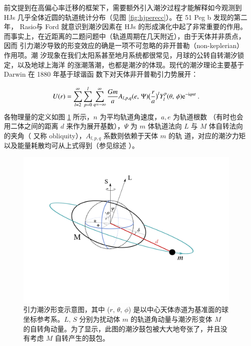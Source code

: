 前文提到在高偏心率迁移的框架下，需要额外引入潮汐过程才能解释如今观测到 HJs
几乎全体近圆的轨道统计分布（见图 \ref{fig:hjperecc}）。在 51 Peg b 发现的第二年，
Rasio与 Ford 就意识到潮汐因素在 HJs 的形成演化中起了非常重要的作用\cite{Rasio1996b}。
而事实上，在近距离的二题问题中（轨道周期在几天附近），由于天体并非质点，因而
引力潮汐导致的形变效应的确是一项不可忽略的非开普勒（non-keplerian）作用项。潮
汐现象在我们太阳系甚至地月系统都很常见，月球的公转自转潮汐锁定，以及地球上海洋
的涨潮落潮，也都是潮汐的体现。现代的潮汐理论主要基于 Darwin 在 1880 年基于球谐函
数下对天体非开普勒引力势展开\cite{Darwin1880}：

\begin{equation} \label{gravipotential}
U(r) = \sum\limits_{l=2}^\infty \sum\limits_{p=0}^l\sum\limits_{q=-\infty}^\infty \frac{Gm}{a} A_{l,p,q}(e,\,\Psi)\big(\frac{r}{a}\big)^l Y_l^p(\theta,\,\phi) \mathrm{e}^{-\mathrm{i}q n t} \ .
\end{equation} %
各物理量的定义如图 \ref{fig:tideillu} 所示，$n$ 为平均轨道角速度，$a,e$ 为轨道根数
（有时也会用二体之间的距离 $d$ 来作为展开基数），$\Psi$ 为 $m$ 体轨道法向 $L$ 
与 $M$ 体自转法向的夹角（ 又称 obliquity），$A_{l,p,q}$ 系数则依赖于天体 $m$ 的轨
道，对应的潮汐力矩以及能量耗散均可从上式得到（参见综述 ）。


\begin{figure}[t]
\centering
\includegraphics[width=1.0\textwidth]{figures/chapter4/fig4_tides.pdf}
\caption{引力潮汐形变示意图，其中 ($r,\,\theta,\,\phi$) 是以中心天体赤道为基准面的球坐标参考系。$L,\,S$ 分别为扰动体 $m$ 的轨道角动量与潮汐形变体 $M$ 的自转角动量。为了显示，此图的潮汐鼓包被大大地夸张了，并且没有考虑 $M$ 自转产生的鼓包。}
\label{fig:tideillu}
\end{figure}


